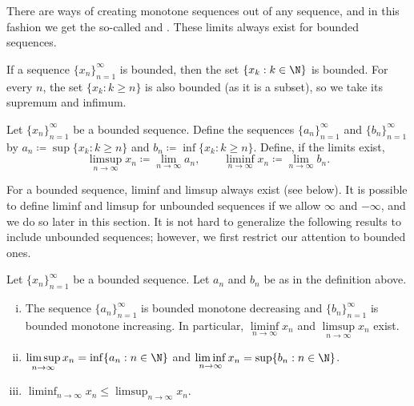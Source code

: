 There are ways of creating monotone sequences out of any sequence, and
in this fashion we
get the so-called \emph{} and
\emph{}.  These limits always exist for bounded
sequences.

If a sequence $\{ x_n \}_{n=1}^\infty$ is bounded, then 
the set $\{ x_k : k \in \N \}$ is bounded.  For every $n$,
the set $\{ x_k : k \geq n \}$ is also bounded (as it is a subset), so we
take its supremum and infimum.

\begin{defn} \label{liminflimsup:def}
Let $\{ x_n \}_{n=1}^\infty$ be a bounded sequence.  Define the sequences
$\{ a_n \}_{n=1}^\infty$
and $\{ b_n \}_{n=1}^\infty$ by
$a_n \coloneqq \sup \{ x_k : k \geq n \}$ and
$b_n \coloneqq \inf \{ x_k : k \geq n \}$.  
Define, if the limits exist,
\begin{equation*}
\limsup_{n \to \infty} x_n \coloneqq \lim_{n \to \infty} a_n ,
\qquad
\liminf_{n \to \infty} x_n \coloneqq \lim_{n \to \infty} b_n .
\end{equation*}
\end{defn}

For a bounded sequence, liminf and limsup always exist (see below).  It is possible
to define liminf and limsup for unbounded sequences if we allow $\infty$
and $-\infty$, and we do so later in this section.
It is not hard to generalize the following results to
include unbounded sequences; however, we first restrict our attention to
bounded ones.

\begin{prop}
Let $\{ x_n \}_{n=1}^\infty$ be a bounded sequence.  Let $a_n$ and $b_n$ be as in
the definition above.
\begin{enumerate}[(i)]
\item
The
sequence $\{ a_n \}_{n=1}^\infty$ is bounded monotone decreasing
and $\{ b_n \}_{n=1}^\infty$ is bounded monotone increasing.  In particular,
$\liminf\limits_{n\to\infty} x_n$ and $\limsup\limits_{n\to\infty} x_n$ exist.
\item
$\displaystyle \limsup_{n \to \infty} x_n = \inf \{ a_n : n \in \N \}$
and
$\displaystyle \liminf_{n \to \infty} x_n = \sup \{ b_n : n \in \N \}$.
\item
$\displaystyle \liminf_{n \to \infty} x_n \leq \limsup_{n \to \infty} x_n$.
\end{enumerate}
\end{prop}

